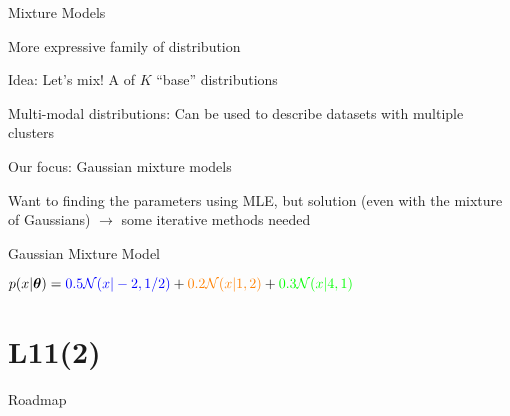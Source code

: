 \documentclass[handout,fleqn,aspectratio=169]{beamer}
\begin{document}
\begin{frame}{Mixture Models}

\plitemsep 0.1in

\bci

\item More expressive family of distribution

\item Idea: Let's mix! A  of $K$ ``base'' distributions
\item Multi-modal distributions: Can be used to describe datasets with multiple clusters

\item Our focus: Gaussian mixture models

\item Want to finding the parameters using MLE, but  solution (even with the mixture of Gaussians) $\rightarrow$ some iterative methods needed
\eci
\end{frame}

\begin{frame}{Gaussian Mixture Model}



\vspace{-0.3cm}
\plitemsep 0.01in

\bci
\item \exam $p(x|\bm{\theta}) = {\color{blue} 0.5\mathcal N(x|-2,1/2)} + {\color{orange} 0.2\mathcal N(x|1,2)} + {\color{green} 0.3\mathcal N(x|4,1)}$

\eci
\end{frame}

\section{L11(2)}
\begin{frame}{Roadmap}

\plitemsep 0.1in

\bce[(1)] 

\item {}
\item {}
\item {}
\ece
\end{frame}
\end{document}
